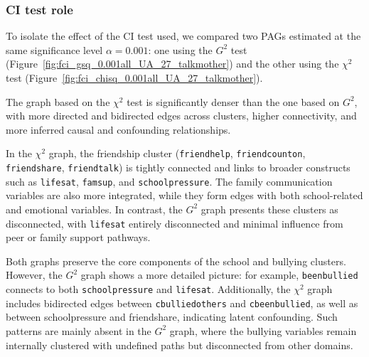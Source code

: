 \documentclass[main.tex]{subfiles}
\begin{document}
\subsubsection{CI test role}
To isolate the effect of the CI test used, we compared two PAGs estimated at the same significance level $\alpha = 0.001$: one using the $G^2$ test (Figure~\ref{fig:fci_gsq_0.001all_UA_27_talkmother}) and the other using the $\chi^2$ test (Figure~\ref{fig:fci_chisq_0.001all_UA_27_talkmother}).

The graph based on the $\chi^2$ test is significantly denser than the one based on $G^2$, with more directed and bidirected edges across clusters, higher connectivity, and more inferred causal and confounding relationships.

In the $\chi^2$ graph, the friendship cluster (\texttt{friendhelp}, \texttt{friendcounton}, \texttt{friendshare}, \texttt{friendtalk}) is tightly connected and links to broader constructs such as \texttt{lifesat}, \texttt{famsup}, and \texttt{schoolpressure}. The family communication variables are also more integrated, while they form edges with both school-related and emotional variables. In contrast, the $G^2$ graph presents these clusters as disconnected, with \texttt{lifesat} entirely disconnected and minimal influence from peer or family support pathways.

Both graphs preserve the core components of the school and bullying clusters. However, the $G^2$ graph shows a more detailed picture: for example, \texttt{beenbullied} connects to both \texttt{schoolpressure} and \texttt{lifesat}. Additionally, the $\chi^2$ graph includes bidirected edges between \texttt{cbulliedothers} and \texttt{cbeenbullied}, as well as between schoolpressure and friendshare, indicating latent confounding. Such patterns are mainly absent in the $G^2$ graph, where the bullying variables remain internally clustered with undefined paths but disconnected from other domains.
\end{document}
